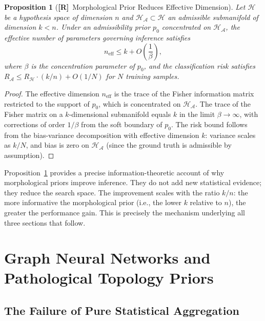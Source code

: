 \documentclass[11pt, oneside]{article}
\numberwithin{equation}{section}
\newcommand{\ClaimR}{\textcolor{rsvpblue}{\textbf{[R]}}}
\theoremstyle{rsvpstyle}
\newtheorem{proposition}[theorem]{Proposition}
\theoremstyle{remark}
\newcommand{\Adm}{\mathcal{A}}
\begin{document}
\begin{proposition}[\ClaimR\ Morphological Prior Reduces Effective Dimension]
\label{prop:morphdim}
Let $\mathcal{H}$ be a hypothesis space of dimension $n$ and $\mathcal{H}_\Adm
\subset \mathcal{H}$ an admissible submanifold of dimension $k < n$. Under an
admissibility prior $p_0$ concentrated on $\mathcal{H}_\Adm$, the effective number
of parameters governing inference satisfies
\begin{equation}
  n_\text{eff} \leq k + O\!\left(\frac{1}{\beta}\right),
\end{equation}
where $\beta$ is the concentration parameter of $p_0$, and the classification risk
satisfies $R_\Adm \leq R_\mathcal{H} \cdot (k/n) + O(1/N)$ for $N$ training samples.
\end{proposition}

\begin{proof}
The effective dimension $n_\text{eff}$ is the trace of the Fisher information matrix
restricted to the support of $p_0$, which is concentrated on $\mathcal{H}_\Adm$.
The trace of the Fisher matrix on a $k$-dimensional submanifold equals $k$ in the
limit $\beta \to \infty$, with corrections of order $1/\beta$ from the soft boundary
of $p_0$. The risk bound follows from the bias-variance decomposition with effective
dimension $k$: variance scales as $k/N$, and bias is zero on $\mathcal{H}_\Adm$
(since the ground truth is admissible by assumption).
\end{proof}

Proposition~\ref{prop:morphdim} provides a precise information-theoretic account of
why morphological priors improve inference. They do not add new statistical evidence;
they reduce the search space. The improvement scales with the ratio $k/n$: the more
informative the morphological prior (i.e., the lower $k$ relative to $n$), the
greater the performance gain. This is precisely the mechanism underlying all three
sections that follow.

\section{Graph Neural Networks and Pathological Topology Priors}
\label{sec:gnn}

\subsection{The Failure of Pure Statistical Aggregation}
\end{document}
